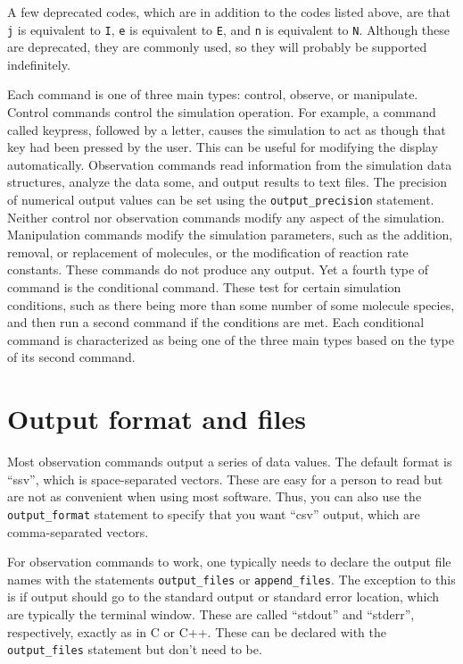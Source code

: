 \documentclass {book}
\newcommand {\ttt} {\texttt}
\begin{document}
A few deprecated codes, which are in addition to the codes listed above, are that \ttt{j} is equivalent to \ttt{I}, \ttt{e} is equivalent to \ttt{E}, and \ttt{n} is equivalent to \ttt{N}. Although these are deprecated, they are commonly used, so they will probably be supported indefinitely.

Each command is one of three main types: control, observe, or manipulate. Control commands control the simulation operation. For example, a command called keypress, followed by a letter, causes the simulation to act as though that key had been pressed by the user. This can be useful for modifying the display automatically. Observation commands read information from the simulation data structures, analyze the data some, and output results to text files. The precision of numerical output values can be set using the \ttt{output\_precision} statement. Neither control nor observation commands modify any aspect of the simulation. Manipulation commands modify the simulation parameters, such as the addition, removal, or replacement of molecules, or the modification of reaction rate constants. These commands do not produce any output. Yet a fourth type of command is the conditional command. These test for certain simulation conditions, such as there being more than some number of some molecule species, and then run a second command if the conditions are met. Each conditional command is characterized as being one of the three main types based on the type of its second command.

\section{Output format and files}

Most observation commands output a series of data values. The default format is ``ssv'', which is space-separated vectors. These are easy for a person to read but are not as convenient when using most software. Thus, you can also use the \ttt{output\_format} statement to specify that you want ``csv'' output, which are comma-separated vectors.

For observation commands to work, one typically needs to declare the output file names with the statements \ttt{output\_files} or \ttt{append\_files}. The exception to this is if output should go to the standard output or standard error location, which are typically the terminal window. These are called ``stdout'' and ``stderr'', respectively, exactly as in C or C++. These can be declared with the \ttt{output\_files} statement but don't need to be.
\end{document}
